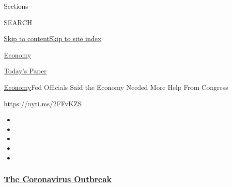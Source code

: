 Sections

SEARCH

\protect\hyperlink{site-content}{Skip to
content}\protect\hyperlink{site-index}{Skip to site index}

\href{https://www.nytimes3xbfgragh.onion/section/business/economy}{Economy}

\href{https://myaccount.nytimes3xbfgragh.onion/auth/login?response_type=cookie\&client_id=vi}{}

\href{https://www.nytimes3xbfgragh.onion/section/todayspaper}{Today's
Paper}

\href{/section/business/economy}{Economy}\textbar{}Fed Officials Said
the Economy Needed More Help From Congress

\url{https://nyti.ms/2FFvKZS}

\begin{itemize}
\item
\item
\item
\item
\item
\end{itemize}

\hypertarget{the-coronavirus-outbreak}{%
\subsubsection{\texorpdfstring{\href{https://www.nytimes3xbfgragh.onion/news-event/coronavirus?name=styln-coronavirus-markets\&region=TOP_BANNER\&variant=undefined\&block=storyline_menu_recirc\&action=click\&pgtype=Article\&impression_id=273caf40-e387-11ea-91a7-0b74cd12f276}{The
Coronavirus
Outbreak}}{The Coronavirus Outbreak}}\label{the-coronavirus-outbreak}}

